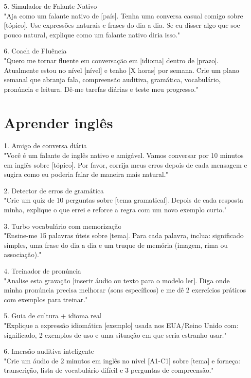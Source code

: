 \documentclass[11pt, a4paper]{article}
\begin{document}
5. Simulador de Falante Nativo \\
"Aja como um falante nativo de [país]. Tenha uma conversa casual comigo sobre [tópico]. Use expressões naturais e frases do dia a dia. Se eu disser algo que soe pouco natural, explique como um falante nativo diria isso."

6. Coach de Fluência \\
"Quero me tornar fluente em conversação em [idioma] dentro de [prazo]. Atualmente estou no nível [nível] e tenho [X horas] por semana. Crie um plano semanal que abranja fala, compreensão auditiva, gramática, vocabulário, pronúncia e leitura. Dê-me tarefas diárias e teste meu progresso."

\section*{Aprender inglês}
1. Amigo de conversa diária \\
"Você é um falante de inglês nativo e amigável. Vamos conversar por 10 minutos em inglês sobre [tópico]. Por favor, corrija meus erros depois de cada mensagem e sugira como eu poderia falar de maneira mais natural." 

2. Detector de erros de gramática \\
"Crie um quiz de 10 perguntas sobre [tema gramatical]. Depois de cada resposta minha, explique o que errei e reforce a regra com um novo exemplo curto." 

3. Turbo vocabulário com memorização \\
"Ensine-me 15 palavras úteis sobre [tema]. Para cada palavra, inclua: significado simples, uma frase do dia a dia e um truque de memória (imagem, rima ou associação)." 

4. Treinador de pronúncia \\
"Analise esta gravação [inserir áudio ou texto para o modelo ler]. Diga onde minha pronúncia precisa melhorar (sons específicos) e me dê 2 exercícios práticos com exemplos para treinar." 

5. Guia de cultura + idioma real \\
"Explique a expressão idiomática [exemplo] usada nos EUA/Reino Unido com: significado, 2 exemplos de uso e uma situação em que seria estranho usar." 

6. Imersão auditiva inteligente \\
"Crie um áudio de 2 minutos em inglês no nível [A1-C1] sobre [tema] e forneça: transcrição, lista de vocabulário difícil e 3 perguntas de compreensão." 
\end{document}
